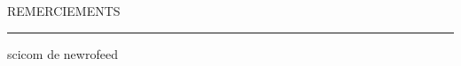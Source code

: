 \begin{center}
\MakeUppercase{\LARGE{R}\Large{emerciements}} \\
\noindent\rule{16cm}{0.4pt}
\end{center}

scicom de newrofeed